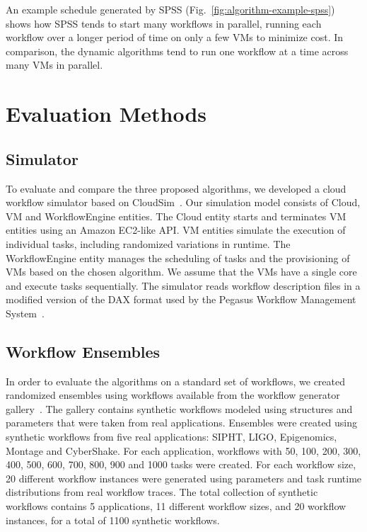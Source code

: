 \documentclass[conference]{IEEEtran}
\begin{document}
An example schedule generated by SPSS (Fig.~\ref{fig:algorithm-example-spss})
shows how SPSS tends to start many workflows in parallel, running each workflow
over a longer period of time on only a few VMs to minimize cost. In comparison,
the dynamic algorithms tend to run one workflow at a time across many VMs in
parallel.


\section{Evaluation Methods}
\label{sec:performance}


\subsection{Simulator}

To evaluate and compare the three proposed algorithms, we developed a cloud
workflow simulator based on CloudSim~\cite{Calheiros2011}. Our simulation model
consists of Cloud, VM and WorkflowEngine entities. The Cloud entity starts and
terminates VM entities using an Amazon EC2-like API. VM entities simulate the
execution of individual tasks, including randomized variations in runtime. The
WorkflowEngine entity manages the scheduling of tasks and the provisioning of 
VMs based on the chosen algorithm. We assume that the VMs have a single core
and execute tasks sequentially. 
The simulator reads workflow description files in
a modified version of the DAX format used by the Pegasus Workflow Management
System~\cite{Deelman2005}. 


\subsection{Workflow Ensembles}
\label{sec:ensembles}


In order to evaluate the algorithms on a standard set of workflows, we created
randomized ensembles using workflows available from the workflow generator
gallery~\cite{WorkflowGenerator}. The
gallery contains synthetic workflows modeled using structures and parameters
that were taken from real applications. Ensembles were created using synthetic
workflows from five real applications: SIPHT, LIGO, Epigenomics, Montage and
CyberShake. For each application, workflows with 50, 100, 200, 300,
400, 500, 600, 700, 800, 900 and 1000 tasks were created. For each workflow
size, 20 different workflow instances were generated using parameters and task
runtime distributions from real workflow traces. The total collection of
synthetic workflows contains 5 applications, 11 different workflow sizes, and 20
workflow instances, for a total of 1100 synthetic workflows.
\end{document}
